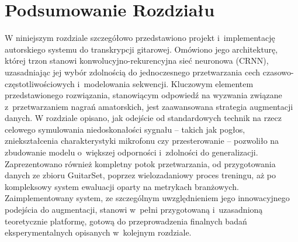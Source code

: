 \section{Podsumowanie Rozdziału}
\label{sec:podsumowanie_rozdzialu_3_fakt}

W niniejszym rozdziale szczegółowo przedstawiono projekt i~implementację autorskiego systemu do transkrypcji gitarowej. Omówiono jego architekturę, której trzon stanowi konwolucyjno-rekurencyjna sieć neuronowa (CRNN), uzasadniając jej wybór zdolnością do jednoczesnego przetwarzania cech czasowo-częstotliwościowych i~modelowania sekwencji. Kluczowym elementem przedstawionego rozwiązania, stanowiącym odpowiedź na wyzwania związane z~przetwarzaniem nagrań amatorskich, jest zaawansowana strategia augmentacji danych. W rozdziale opisano, jak odejście od standardowych technik na rzecz celowego symulowania niedoskonałości sygnału – takich jak pogłos, zniekształcenia charakterystyki mikrofonu czy przesterowanie – pozwoliło na zbudowanie modelu o~większej odporności i~zdolności do generalizacji. Zaprezentowano również kompletny potok przetwarzania, od przygotowania danych ze zbioru GuitarSet, poprzez wielozadaniowy proces treningu, aż po kompleksowy system ewaluacji oparty na metrykach branżowych. Zaimplementowany system, ze szczególnym uwzględnieniem jego innowacyjnego podejścia do augmentacji, stanowi w~pełni przygotowaną i~uzasadnioną teoretycznie platformę, gotową do przeprowadzenia finalnych badań eksperymentalnych opisanych w~kolejnym rozdziale.
